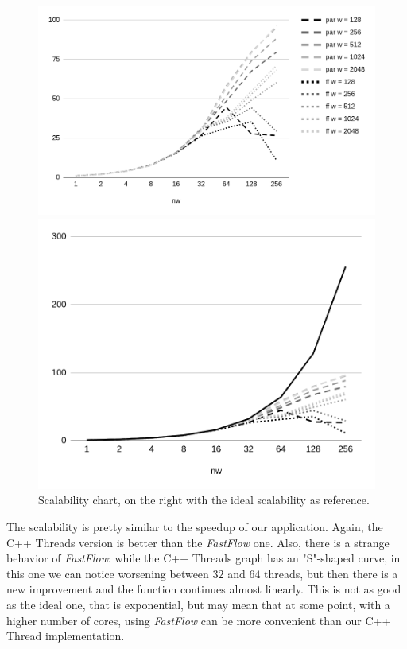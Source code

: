 \begin{figure}[H]
    \centering
    \begin{minipage}{.68\linewidth}
        \includegraphics[width=\linewidth]{assets/scalability}
    \end{minipage}
    \begin{minipage}{.3\linewidth}
        \includegraphics[width=\linewidth]{assets/scalability_ideal}
    \end{minipage}
    \caption{Scalability chart, on the right with the ideal scalability as reference.}
    \label{fig:scalability}
\end{figure}

\noindent
The scalability is pretty similar to the speedup of our application. Again, the C++ Threads version is better than the \textit{FastFlow} one. Also, there is a strange behavior of \textit{FastFlow}: while the C++ Threads graph has an "S"-shaped curve, in this one we can notice worsening between $32$ and $64$ threads, but then there is a new improvement and the function continues almost linearly. This is not as good as the ideal one, that is exponential, but may mean that at some point, with a higher number of cores, using \textit{FastFlow} can be more convenient than our C++ Thread implementation.



